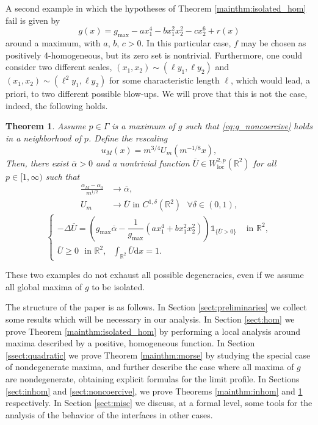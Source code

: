 \documentclass[10pt,a4paper]{article}
\newcommand{\gmax}{g_{\mathrm{max}}}
\newcommand{\loc}{\mathrm{loc}}
\newcommand{\RR}{\mathbb{R}}
\newcommand{\faskip}{\hspace{8pt}}
\newtheorem{mainthm}{Theorem}
\numberwithin{equation}{section}
\begin{document}
A second example in which the hypotheses of Theorem \ref{mainthm:isolated_hom} fail is given by
\begin{equation}
	\label{eq:g_noncoercive}
	g(x) = \gmax - a x_1^{4} - b x_1^{2}x_2^{2} - c x_2^{6} + r(x)
\end{equation}
around a maximum, with $ a $, $ b $, $ c > 0 $. In this particular case, $ f $ may be chosen as positively 4-homogeneous, but its zero set is nontrivial. Furthermore, one could consider two different scales, $ (x_1, x_2) \sim (\ell y_1, \ell y_2) $ and $ (x_1, x_2) \sim (\ell^2 y_1, \ell y_2) $ for some characteristic length $ \ell $, which would lead, a priori, to two different possible blow-ups. We will prove that this is not the case, indeed, the following holds.

\begin{mainthm}
	\label{mainthm:noncoercive}
	Assume $ p\in \Gamma $ is a maximum of $ g $ such that \eqref{eq:g_noncoercive} holds in a neighborhood of $ p $. Define the rescaling
\[
	u_M(x) = m^{3/4} U_m(m^{-1/8}x),
\]
Then, there exist $ \overline{\alpha} > 0 $ and a nontrivial function $ \overline{U} \in W^{2,p}_{\loc}(\RR^{2}) $ for all $ p \in [1, \infty) $ such that 
	\begin{align*}
		\frac{\alpha_{M} - \alpha_0}{m^{1/2}} &\rightarrow \overline{\alpha}, \\
		U_{m} &\rightarrow \overline{U} \text{ in }C^{1,\delta}(\RR^{2}) \faskip \forall \delta \in (0,1),
	\end{align*}
\[
	\begin{cases}
		-\Delta \overline{U} = \left( \gmax\overline{\alpha} - \dfrac{1}{\gmax}(a x_1^{4} + bx_1^{2}x_2^{2}) \right) \mathbb{1}_{\{\overline{U} > 0 \}} & \text{ in }\RR^{2},\\
		\overline{U} \geq 0 \faskip \text{in }\RR^{2}, \faskip \displaystyle \int_{\RR^{2}} \overline{U} \mathrm{d}x  = 1. 	& 
	\end{cases}
\]
\end{mainthm}

These two examples do not exhaust all possible degeneracies, even if we assume all global maxima of $ g $ to be isolated.

The structure of the paper is as follows. In Section \ref{sect:preliminaries} we collect some results which will be necessary in our analysis. In Section \ref{sect:hom} we prove Theorem \ref{mainthm:isolated_hom} by performing a local analysis around maxima described by a positive, homogeneous function. In Section \ref{ssect:quadratic} we prove Theorem \ref{mainthm:morse} by studying the special case of nondegenerate maxima, and further describe the case where all maxima of $g$ are nondegenerate, obtaining explicit formulas for the limit profile. In Sections \ref{sect:inhom} and \ref{sect:noncoercive}, we prove Theorems \ref{mainthm:inhom} and \ref{mainthm:noncoercive} respectively. In Section \ref{sect:misc} we discuss, at a formal level, some tools for the analysis of the behavior of the interfaces in other cases. 
\end{document}
